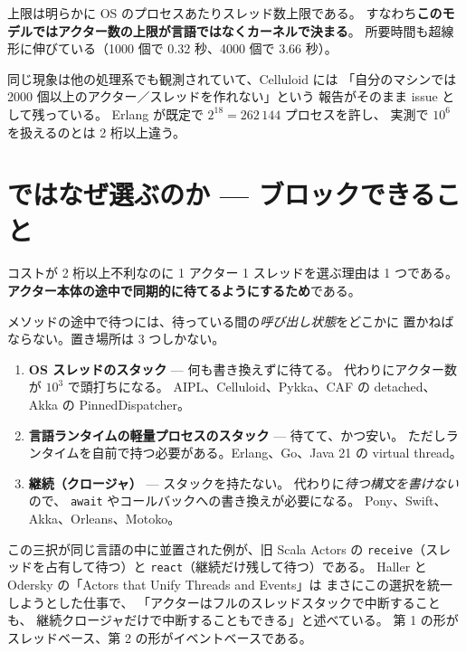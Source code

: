\documentclass[11pt,a4paper]{ltjsarticle}
\begin{document}

上限は明らかに OS のプロセスあたりスレッド数上限である。
すなわち\textbf{このモデルではアクター数の上限が言語ではなくカーネルで決まる}。
所要時間も超線形に伸びている（1000 個で 0.32 秒、4000 個で 3.66 秒）。

同じ現象は他の処理系でも観測されていて、Celluloid には
「自分のマシンでは 2000 個以上のアクター／スレッドを作れない」という
報告がそのまま issue として残っている。
Erlang が既定で $2^{18}=262\,144$ プロセスを許し、
実測で $10^{6}$ を扱えるのとは 2 桁以上違う。

\section{ではなぜ選ぶのか --- ブロックできること}
\label{sec:why}

コストが 2 桁以上不利なのに 1 アクター 1 スレッドを選ぶ理由は 1 つである。
\textbf{アクター本体の途中で同期的に待てるようにするため}である。

メソッドの途中で待つには、待っている間の\emph{呼び出し状態}をどこかに
置かねばならない。置き場所は 3 つしかない。

\begin{enumerate}
\item \textbf{OS スレッドのスタック} --- 何も書き換えずに待てる。
  代わりにアクター数が $10^{3}$ で頭打ちになる。
  AIPL、Celluloid、Pykka、CAF の detached、Akka の PinnedDispatcher。
\item \textbf{言語ランタイムの軽量プロセスのスタック} --- 待てて、かつ安い。
  ただしランタイムを自前で持つ必要がある。Erlang、Go、Java 21 の virtual thread。
\item \textbf{継続（クロージャ）} --- スタックを持たない。
  代わりに\emph{待つ構文を書けない}ので、
  \texttt{await} やコールバックへの書き換えが必要になる。
  Pony、Swift、Akka、Orleans、Motoko。
\end{enumerate}

この三択が同じ言語の中に並置された例が、旧 Scala Actors の
\texttt{receive}（スレッドを占有して待つ）と
\texttt{react}（継続だけ残して待つ）である。
Haller と Odersky の「Actors that Unify Threads and Events」は
まさにこの選択を統一しようとした仕事で、
「アクターはフルのスレッドスタックで中断することも、
継続クロージャだけで中断することもできる」と述べている。
第 1 の形がスレッドベース、第 2 の形がイベントベースである。
\end{document}
